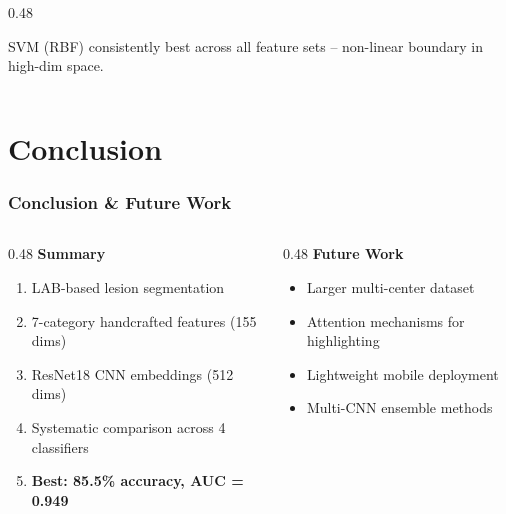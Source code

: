 \documentclass[aspectratio=169,professionalfonts]{beamer}
\begin{document}
\begin{frame}
\begin{columns}[T]
\begin{column}{0.48\textwidth}
            \begin{tcolorbox}[colback=ugmLightGrey,colframe=ugmBlue,title={\footnotesize Classifier Choice}]
                \footnotesize
                SVM (RBF) consistently best across all feature sets -- non-linear boundary in high-dim space.
            \end{tcolorbox}
        \end{column}
    \end{columns}
\end{frame}

\section{Conclusion}

\begin{frame}
    \frametitle{Conclusion \& Future Work}
    \footnotesize
    
    \begin{columns}[T]
        \begin{column}{0.48\textwidth}
            \textbf{Summary}
            \begin{enumerate}
                \footnotesize
                \setlength{\itemsep}{1pt}
                \item LAB-based lesion segmentation
                \item 7-category handcrafted features (155 dims)
                \item ResNet18 CNN embeddings (512 dims)
                \item Systematic comparison across 4 classifiers
                \item \textbf{Best: 85.5\% accuracy, AUC = 0.949}
            \end{enumerate}
        \end{column}
        
        \begin{column}{0.48\textwidth}
            \textbf{Future Work}
            \begin{itemize}
                \footnotesize
                \setlength{\itemsep}{1pt}
                \item Larger multi-center dataset
                \item Attention mechanisms for highlighting
                \item Lightweight mobile deployment
                \item Multi-CNN ensemble methods
            \end{itemize}
        \end{column}
    \end{columns}
\end{frame}
\end{document}
